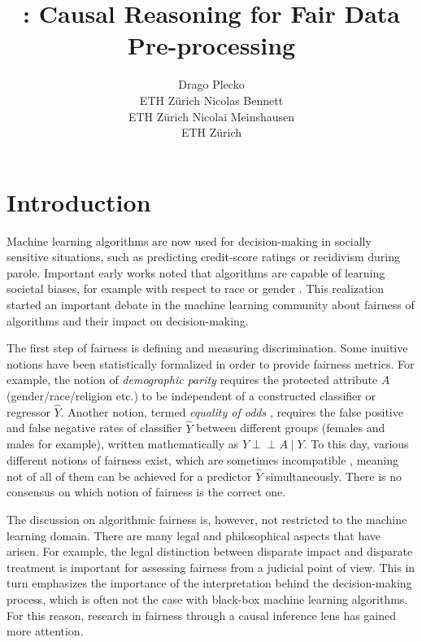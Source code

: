 \documentclass[
  notitle]{jss}
\author{
Drago Plecko\\ETH Zürich \And Nicolas Bennett\\ETH Zürich \And Nicolai Meinshausen\\ETH Zürich
}
\title{\pkg{fairadapt}: Causal Reasoning for Fair Data Pre-processing}
\begin{document}
\maketitle

\hypertarget{introduction}{%
\section{Introduction}\label{introduction}}

\label{Introduction}

Machine learning algorithms are now used for decision-making in socially
sensitive situations, such as predicting credit-score ratings or
recidivism during parole. Important early works noted that algorithms
are capable of learning societal biases, for example with respect to
race \citep{larson2016compas} or gender
\citep{blau2003, lambrecht2019algorithmic}. This realization started an
important debate in the machine learning community about fairness of
algorithms and their impact on decision-making.

The first step of fairness is defining and measuring discrimination.
Some inuitive notions have been statistically formalized in order to
provide fairness metrics. For example, the notion of
\textit{demographic parity} \citep{darlington1971} requires the
protected attribute \(A\) (gender/race/religion etc.) to be independent
of a constructed classifier or regressor \(\widehat{Y}\). Another
notion, termed \textit{equality of odds} \citep{hardt2016}, requires the
false positive and false negative rates of classifier \(\widehat{Y}\)
between different groups (females and males for example), written
mathematically as \(\widehat{Y} {\perp\!\!\!\perp}A \mid Y\). To this
day, various different notions of fairness exist, which are sometimes
incompatible \citep{corbett2018measure}, meaning not of all of them can
be achieved for a predictor \(\widehat{Y}\) simultaneously. There is no
consensus on which notion of fairness is the correct one.

The discussion on algorithmic fairness is, however, not restricted to
the machine learning domain. There are many legal and philosophical
aspects that have arisen. For example, the legal distinction between
disparate impact and disparate treatment \citep{mcginley2011ricci} is
important for assessing fairness from a judicial point of view. This in
turn emphasizes the importance of the interpretation behind the
decision-making process, which is often not the case with black-box
machine learning algorithms. For this reason, research in fairness
through a causal inference lens has gained more attention.
\end{document}
